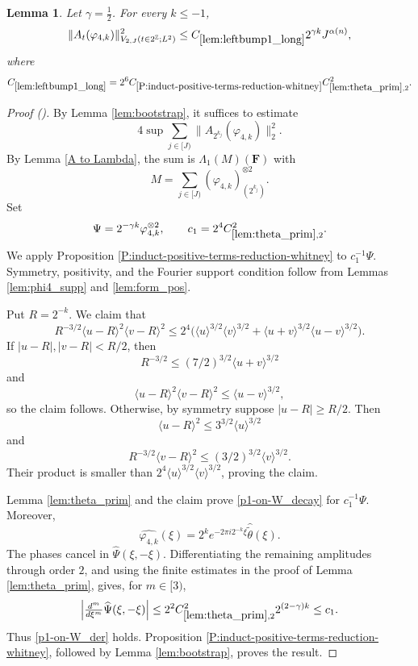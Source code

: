 \documentclass[12pt,reqno]{amsart}
\newcommand{\auto}{{({\tiny\faCar})}}
\theoremstyle{plain}
\newtheorem{lemma}[theorem]{Lemma}
\numberwithin{equation}{section}
\theoremstyle{remark}
\newcommand{\uses}[1]{}
\newcommand{\usesdefs}[1]{}
\newcommand{\F}{\mathbf{F}}
\begin{document}
\begin{lemma}\label{lem:leftbump1_long}\uses{lem:bootstrap,A to Lambda,lem:theta_prim,P:induct-positive-terms-reduction-whitney,lem:phi4_supp,lem:form_pos}\usesdefs{A_def,bracket bump,normalized function tuples,auto:prism-form-definition,defn:window based bump functions}
Let $\gamma=\frac12$. For every $k\le-1$,
\begin{equation}\label{auto:left-bump-one-long-bound}
\|A_t(\varphi_{4,k})\|_{V_{2,J}(t\in2^\mathbb Z;L^2)}^2
\le C_{\ref{lem:leftbump1_long}}2^{\gamma k}J^{\alpha(n)},
\end{equation}
where
\begin{equation}\label{auto:left-bump-one-long-constant-definition}
C_{\ref{lem:leftbump1_long}}
=2^6C_{\ref{P:induct-positive-terms-reduction-whitney}}
C_{\ref{lem:theta_prim},2}^2.
\end{equation}
\end{lemma}

\begin{proof}[Proof \auto]
By Lemma \ref{lem:bootstrap}, it suffices to estimate
\[
4\sup\sum_{j\in[J)}\|A_{2^{k_j}}(\varphi_{4,k})\|_2^2.
\]
By Lemma \ref{A to Lambda}, the sum is $\Lambda_1(M)(\F)$ with
\[
M=\sum_{j\in[J)}(\varphi_{4,k})_{(2^{k_j})}^{\otimes2}.
\]
Set
\[
\Psi=2^{-\gamma k}\varphi_{4,k}^{\otimes2},
\qquad
c_1=2^4C_{\ref{lem:theta_prim},2}^2.
\]
We apply Proposition \ref{P:induct-positive-terms-reduction-whitney} to $c_1^{-1}\Psi$. Symmetry, positivity, and the Fourier support condition follow from Lemmas \ref{lem:phi4_supp} and \ref{lem:form_pos}.

Put $R=2^{-k}$. We claim that
\[
R^{-3/2}\langle u-R\rangle^2\langle v-R\rangle^2
\le2^4\bigl(
\langle u\rangle^{3/2}\langle v\rangle^{3/2}
+\langle u+v\rangle^{3/2}\langle u-v\rangle^{3/2}
\bigr).
\]
If $|u-R|,|v-R|<R/2$, then
\[
R^{-3/2}\le(7/2)^{3/2}\langle u+v\rangle^{3/2}
\]
and
\[
\langle u-R\rangle^2\langle v-R\rangle^2
\le\langle u-v\rangle^{3/2},
\]
so the claim follows. Otherwise, by symmetry suppose $|u-R|\ge R/2$. Then
\[
\langle u-R\rangle^2\le3^{3/2}\langle u\rangle^{3/2}
\]
and
\[
R^{-3/2}\langle v-R\rangle^2
\le(3/2)^{3/2}\langle v\rangle^{3/2}.
\]
Their product is smaller than $2^4\langle u\rangle^{3/2}\langle v\rangle^{3/2}$, proving the claim.

Lemma \ref{lem:theta_prim} and the claim prove \eqref{p1-on-W_decay} for $c_1^{-1}\Psi$. Moreover,
\[
\widehat{\varphi_{4,k}}(\xi)
=2^ke^{-2\pi i2^{-k}\xi}\widehat{\widetilde\theta}(\xi).
\]
The phases cancel in $\widehat\Psi(\xi,-\xi)$. Differentiating the remaining amplitudes through order $2$, and using the finite estimates in the proof of Lemma \ref{lem:theta_prim}, gives, for $m\in[3)$,
\[
\left|\tfrac{d^m}{d\xi^m}\widehat\Psi(\xi,-\xi)\right|
\le2^2C_{\ref{lem:theta_prim},2}^2 2^{(2-\gamma)k}
\le c_1.
\]
Thus \eqref{p1-on-W_der} holds. Proposition \ref{P:induct-positive-terms-reduction-whitney}, followed by Lemma \ref{lem:bootstrap}, proves the result.
\end{proof}
\end{document}
